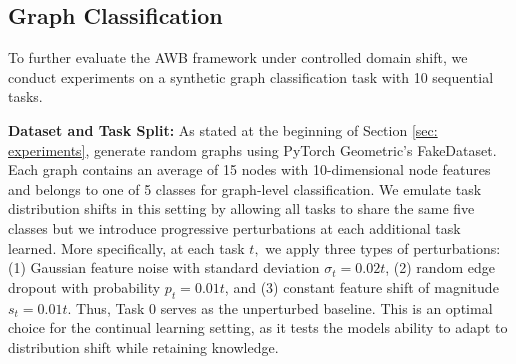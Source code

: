 



\subsection{Graph Classification}
To further evaluate the AWB framework under controlled domain shift, we conduct experiments on a synthetic graph classification task with 10 sequential tasks.

\textbf{Dataset and Task Split:} As stated at the beginning of Section \ref{sec: experiments}, generate random graphs using PyTorch Geometric's FakeDataset. Each graph contains an average of 15 nodes with 10-dimensional node features and belongs to one of 5 classes for graph-level classification. We emulate task distribution shifts in this setting by allowing all tasks to share the same five classes but we introduce progressive perturbations at each additional task learned. More specifically, at each task $t,$ we apply three types of perturbations: (1) Gaussian feature noise with standard deviation $\sigma_t = 0.02t$, (2) random edge dropout with probability $p_t = 0.01t$, and (3) constant feature shift of magnitude $s_t = 0.01t$. Thus, Task $0$ serves as the unperturbed baseline. This is an optimal choice for the continual learning setting, as it tests the models ability to adapt to distribution shift while retaining knowledge.


